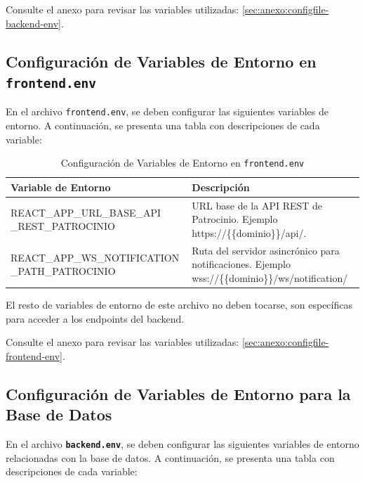 Consulte el anexo para revisar las variables utilizadas: \ref{sec:anexo:configfile-backend-env}.


\subsection{Configuración de Variables de Entorno en \texttt{frontend.env}}

En el archivo \texttt{frontend.env}, se deben configurar las siguientes variables de entorno. A continuación, se presenta una tabla con descripciones de cada variable:

\begin{table}[H]
    \centering
    \begin{tabular}{|p{7cm}|p{7cm}|}
    \hline
    \textbf{Variable de Entorno} & \textbf{Descripción} \\
    \hline
    REACT\_APP\_URL\_BASE\_API
    \_REST\_PATROCINIO & URL base de la API REST de Patrocinio. Ejemplo https://\{\{dominio\}\}/api/. \\
    \hline
    REACT\_APP\_WS\_NOTIFICATION
    \_PATH\_PATROCINIO & Ruta del servidor asincrónico para notificaciones. Ejemplo wss://\{\{dominio\}\}/ws/notification/\\
        \hline
    \end{tabular}
    \caption{Configuración de Variables de Entorno en \texttt{frontend.env}}
    \label{tab:frontend-env-variables}
\end{table}
El resto de variables de entorno de este archivo no deben tocarse, son específicas para acceder a los endpoints del backend.

Consulte el anexo para revisar las variables utilizadas: \ref{sec:anexo:configfile-frontend-env}.



\subsection{Configuración de Variables de Entorno para la Base de Datos}

En el archivo \texttt{\textbf{backend.env}}, se deben configurar las siguientes variables de entorno relacionadas con la base de datos. A continuación, se presenta una tabla con descripciones de cada variable:

